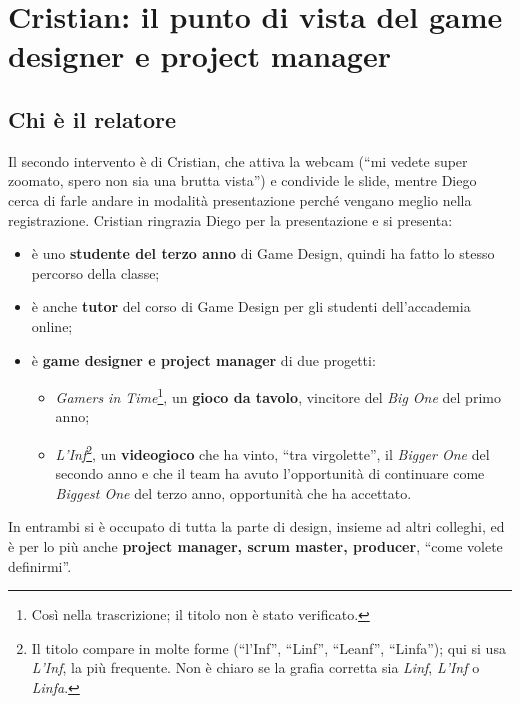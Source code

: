 \section{Cristian: il punto di vista del game designer e project manager}
\label{sec:z3-cristian}

\subsection{Chi è il relatore}

Il secondo intervento è di Cristian, che attiva la webcam (``mi vedete super
zoomato, spero non sia una brutta vista'') e condivide le slide, mentre Diego
cerca di farle andare in modalità presentazione perché vengano meglio nella
registrazione. Cristian ringrazia Diego per la presentazione e si presenta:
\begin{itemize}
  \item è uno \textbf{studente del terzo anno} di Game Design, quindi ha fatto
        lo stesso percorso della classe;
  \item è anche \textbf{tutor} del corso di Game Design per gli studenti
        dell'accademia online;
  \item è \textbf{game designer e project manager} di due progetti:
        \begin{itemize}
          \item \emph{Gamers in Time}\footnote{Così nella trascrizione;
                il titolo non è stato verificato.}, un \textbf{gioco da
                tavolo}, vincitore del \emph{Big One} del primo anno;
          \item \emph{L'Inf}\footnote{Il titolo compare in molte forme
                (``l'Inf'', ``Linf'', ``Leanf'', ``Linfa''); qui si usa
                \emph{L'Inf}, la più frequente. Non è chiaro se la grafia
                corretta sia \emph{Linf}, \emph{L'Inf} o \emph{Linfa}.}, un
                \textbf{videogioco} che ha vinto, ``tra virgolette'', il
                \emph{Bigger One} del secondo anno e che il team ha avuto
                l'opportunità di continuare come \emph{Biggest One} del terzo
                anno, opportunità che ha accettato.
        \end{itemize}
\end{itemize}
In entrambi si è occupato di tutta la parte di design, insieme ad altri
colleghi, ed è per lo più anche \textbf{project manager, scrum master,
producer}, ``come volete definirmi''.

